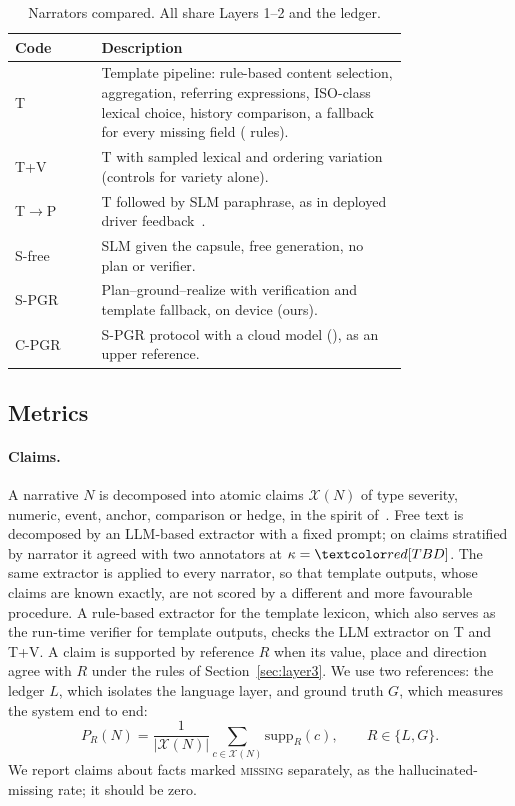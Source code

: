 \begin{table}[t]
\caption{Narrators compared. All share Layers 1--2 and the ledger.}
\label{tab:conditions}
\small
\begin{tabular}{@{}lp{0.78\linewidth}@{}}
\toprule
Code & Description \\
\midrule
T & Template pipeline: rule-based content selection, aggregation, referring expressions, ISO-class lexical choice, history comparison, a fallback for every missing field (\TBD{} rules). \\
T+V & T with sampled lexical and ordering variation (controls for variety alone). \\
T$\rightarrow$P & T followed by SLM paraphrase, as in deployed driver feedback~\cite{thompson2026localising}. \\
S-free & SLM given the capsule, free generation, no plan or verifier. \\
S-PGR & Plan--ground--realize with verification and template fallback, on device (ours). \\
C-PGR & S-PGR protocol with a cloud model (\TBD{}), as an upper reference. \\
\bottomrule
\end{tabular}
\end{table}

\subsection{Metrics}
\label{sec:metrics}

\paragraph{Claims.}
A narrative $N$ is decomposed into atomic claims $\mathcal X(N)$ of type severity, numeric, event, anchor, comparison or hedge, in the spirit of~\cite{min2023factscore,wiseman2017challenges}.
Free text is decomposed by an LLM-based extractor with a fixed prompt; on \TBD{} claims stratified by narrator it agreed with two annotators at $\kappa=\TBD{}$.
The same extractor is applied to every narrator, so that template outputs, whose claims are known exactly, are not scored by a different and more favourable procedure.
A rule-based extractor for the template lexicon, which also serves as the run-time verifier for template outputs, checks the LLM extractor on T and T+V.
A claim is supported by reference $R$ when its value, place and direction agree with $R$ under the rules of Section~\ref{sec:layer3}.
We use two references: the ledger $L$, which isolates the language layer, and ground truth $G$, which measures the system end to end:
\begin{equation}
P_R(N)=\frac{1}{|\mathcal X(N)|}\sum_{c\in\mathcal X(N)}\mathrm{supp}_R(c),\qquad R\in\{L,G\}.
\end{equation}
We report claims about facts marked \textsc{missing} separately, as the hallucinated-missing rate; it should be zero.

